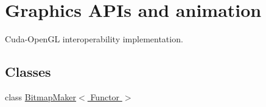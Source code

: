 \hypertarget{group__api__graphics}{}\section{Graphics A\+P\+Is and animation}
\label{group__api__graphics}


Cuda-\/\+Open\+GL interoperability implementation.  


\subsection*{Classes}
\begin{DoxyCompactItemize}
\item 
class \hyperlink{class_bitmap_maker}{Bitmap\+Maker$<$ Functor $>$}
\end{DoxyCompactItemize}
